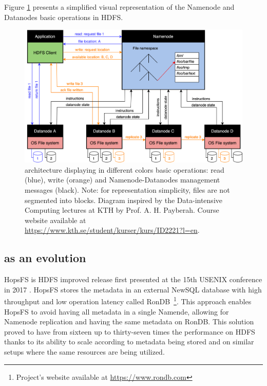 Figure \ref{fig:hdfs} presents a simplified visual representation of the Namenode and Datanodes basic operations in \gls{HDFS}.

\begin{figure}[!ht]
    \begin{center}
      \includegraphics[width=\textwidth]{figures/2-background/HDFS.png}
    \end{center}
    \caption[Hadoop Distributed File System architecture]{ architecture displaying in different colors basic operations: read (blue), write (orange) and Namenode-Datanodes management messages (black). Note: for representation simplicity, files are not segmented into blocks. Diagram inspired by the Data-intensive Computing lectures at KTH by Prof. A. H. Payberah. Course website available at \url{https://www.kth.se/student/kurser/kurs/ID2221?l=en}.}
    \label{fig:hdfs}
\end{figure}
 
\subsection{ as an  evolution}

\gls{HopsFS} is \gls{HDFS} improved release first presented at the 15th USENIX conference in 2017 \cite{niaziHopsFSScalingHierarchical2017}. \gls{HopsFS} stores the metadata in an external NewSQL database with high throughput and low operation latency called RonDB~\footnote{Project's website available at \url{https://www.rondb.com}}. This approach enables \gls{HopsFS} to avoid having all metadata in a single Namende, allowing for Namenode replication and having the same metadata on RonDB. This solution proved to have from sixteen up to thirty-seven times the performance on \gls{HDFS} thanks to its ability to scale according to metadata being stored and on similar setups where the same resources are being utilized. 

